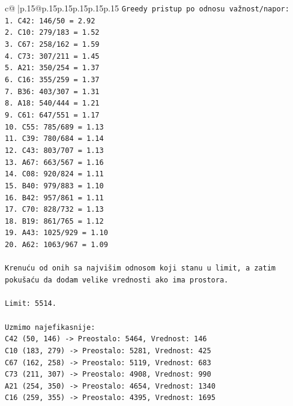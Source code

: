 \documentclass{article}
\begin{document}
{\begin{supertabular}{c@{$\;$}|p{.15\linewidth}@{}p{.15\linewidth}p{.15\linewidth}p{.15\linewidth}p{.15\linewidth}p{.15\linewidth}}
{{{\texttt{Greedy pristup po odnosu važnost/napor:} \\
\texttt{1. C42: 146/50 = 2.92} \\
\texttt{2. C10: 279/183 = 1.52} \\
\texttt{3. C67: 258/162 = 1.59} \\
\texttt{4. C73: 307/211 = 1.45} \\
\texttt{5. A21: 350/254 = 1.37} \\
\texttt{6. C16: 355/259 = 1.37} \\
\texttt{7. B36: 403/307 = 1.31} \\
\texttt{8. A18: 540/444 = 1.21} \\
\texttt{9. C61: 647/551 = 1.17} \\
\texttt{10. C55: 785/689 = 1.13} \\
\texttt{11. C39: 780/684 = 1.14} \\
\texttt{12. C43: 803/707 = 1.13} \\
\texttt{13. A67: 663/567 = 1.16} \\
\texttt{14. C08: 920/824 = 1.11} \\
\texttt{15. B40: 979/883 = 1.10} \\
\texttt{16. B42: 957/861 = 1.11} \\
\texttt{17. C70: 828/732 = 1.13} \\
\texttt{18. B19: 861/765 = 1.12} \\
\texttt{19. A43: 1025/929 = 1.10} \\
\texttt{20. A62: 1063/967 = 1.09} \\
\\ 
\texttt{Krenuću od onih sa najvišim odnosom koji stanu u limit, a zatim pokušaću da dodam velike vrednosti ako ima prostora.} \\
\\ 
\texttt{Limit: 5514.} \\
\\ 
\texttt{Uzmimo najefikasnije:} \\
\texttt{C42 (50, 146) {-}> Preostalo: 5464, Vrednost: 146} \\
\texttt{C10 (183, 279) {-}> Preostalo: 5281, Vrednost: 425} \\
\texttt{C67 (162, 258) {-}> Preostalo: 5119, Vrednost: 683} \\
\texttt{C73 (211, 307) {-}> Preostalo: 4908, Vrednost: 990} \\
\texttt{A21 (254, 350) {-}> Preostalo: 4654, Vrednost: 1340} \\
\texttt{C16 (259, 355) {-}> Preostalo: 4395, Vrednost: 1695} \\
}}}
\end{supertabular}}
\end{document}

